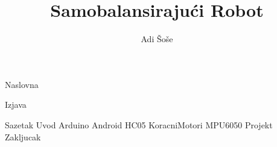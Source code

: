 \documentclass[12pt,a4paper]{article}
\title{Samobalansirajući Robot}
\author{Adi Šoše}
\begin{document}
\selectfont


{Naslovna}

{Izjava}
\pagebreak

\setcounter{page}{1}
\renewcommand*\contentsname{Sadržaj}
\tableofcontents

\pagebreak
{}



\linespread{1.3}

{Sazetak}
{Uvod}
{Arduino}
{Android}
{HC05}
{KoracniMotori}
{MPU6050}
{Projekt}
{Zakljucak}
\end{document}
